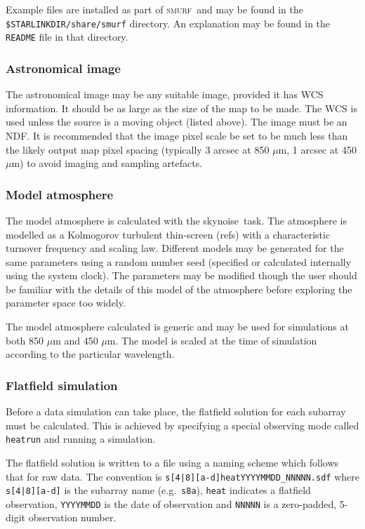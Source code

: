 \documentclass[twoside,11pt]{article}
\newcommand{\xref}[3]{#1}
\renewcommand{\_}{\texttt{\symbol{95}}}
\newcommand{\SMURF}{\textsc{smurf}}
\newcommand{\task}[1]{\textsf{#1}}
\newcommand{\skynoise}{\xref{\task{skynoise}}{sun258}{SKYNOISE}}
\begin{document}
Example files are installed as part of \SMURF\ and may be found in the
\texttt{\$STARLINK\_DIR/share/smurf} directory. An explanation may be
found in the \texttt{README} file in that directory. 

\subsubsection{Astronomical image}

The astronomical image may be any suitable image, provided it has WCS
information. It should be as large as the size of the map to be
made. The WCS is used unless the source is a moving object (listed
above). The image must be an NDF. It is recommended that the image
pixel scale be set to be much less than the likely output map pixel
spacing (typically 3 arcsec at 850 $\mu$m, 1 arcsec at 450 $\mu$m) to
avoid imaging and sampling artefacts.

\subsubsection{Model atmosphere}

The model atmosphere is calculated with the \skynoise\ task. The
atmosphere is modelled as a Kolmogorov turbulent thin-screen (refs)
with a characteristic turnover frequency and scaling law. Different
models may be generated for the same parameters using a random number
seed (specified or calculated internally using the system clock). The
parameters may be modified though the user should be familiar with the
details of this model of the atmosphere before exploring the parameter
space too widely.

The model atmosphere calculated is generic and may be used for
simulations at both 850 $\mu$m and 450 $\mu$m. The model is scaled
at the time of simulation according to the particular wavelength.

\subsubsection{Flatfield simulation}

Before a data simulation can take place, the flatfield solution for
each subarray must be calculated. This is achieved by specifying a
special observing mode called \texttt{heatrun} and running a
simulation. 

The flatfield solution is written to a file using a naming scheme
which follows that for raw data. The convention is
\verb+s[4|8][a-d]heatYYYYMMDD_NNNNN.sdf+ where \verb+s[4|8][a-d]+ is
the subarray name (e.g.\ \verb+s8a+), \verb+heat+ indicates a
flatfield observation, \verb+YYYYMMDD+ is the date of observation and
\verb+NNNNN+ is a zero-padded, 5-digit observation number.
\end{document}

